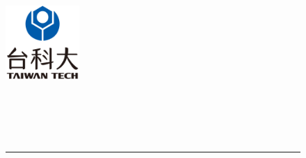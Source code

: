 
\newcommand\itsempty{}
%
\begin{titlepage}

\begin{center}
%



\begin{figure}[htbp]
	\begin{minipage}[b]{5cm} 
		\raggedright
		\includegraphics[width=1.1in]{frontpages/ntust_logo.pdf}
		\label{fig:ntust_logo}
	\end{minipage}%
	\begin{minipage}[b]{0.5\textwidth} 
	\centering
	\makebox[3cm][c]{\Huge{\univCname}}\\  %
	\vspace{0.5cm}
	\makebox[3cm][c]{\Huge{\deptCname}}\\ %
	\vspace{0.5cm}
	\end{minipage}%
\\ 
\rule{16cm}{3pt}
\end{figure}



\end{center}
\end{titlepage}
